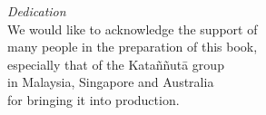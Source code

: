
\cleartorecto
\thispagestyle{empty}

\vspace*{20mm}

{\centering
\small

\textit{Dedication}\\[0.4\baselineskip]
We would like to acknowledge the support of\\
many people in the preparation of this book,\\
especially that of the Kataññutā group\\
in Malaysia, Singapore and Australia\\
for bringing it into production.

}

